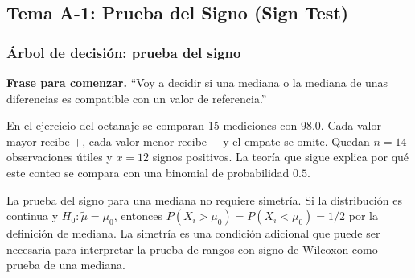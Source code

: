 \documentclass[11pt,a4paper]{article}
\newcommand{\inicio}[1]{\textbf{Frase para comenzar.} ``#1''\par}
\begin{document}
\subsection{Tema A-1: Prueba del Signo (Sign Test)}

\subsubsection{Árbol de decisión: prueba del signo}
\begin{center}\end{center}

\inicio{Voy a decidir si una mediana o la mediana de unas diferencias es compatible con un valor de referencia.}
\begin{idea}
En el ejercicio del octanaje se comparan 15 mediciones con $98.0$. Cada valor mayor recibe $+$, cada valor menor recibe $-$ y el empate se omite. Quedan $n=14$ observaciones útiles y $x=12$ signos positivos. La teoría que sigue explica por qué este conteo se compara con una binomial de probabilidad $0.5$.
\end{idea}

\begin{importante}
La prueba del signo para una mediana no requiere simetría. Si la distribución es continua y $H_0:\tilde\mu=\mu_0$, entonces $P(X_i>\mu_0)=P(X_i<\mu_0)=1/2$ por la definición de mediana. La simetría es una condición adicional que puede ser necesaria para interpretar la prueba de rangos con signo de Wilcoxon como prueba de una mediana.
\end{importante}
\end{document}
